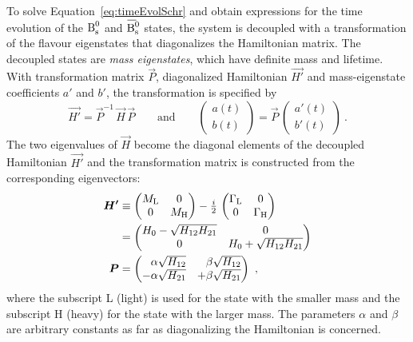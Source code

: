 To solve Equation~\ref{eq:timeEvolSchr} and obtain expressions for the time evolution of the $\text{B}_\text{s}^\text{0}$ and $\Bsbar$ states, the system is
decoupled with a transformation of the flavour eigenstates that diagonalizes the Hamiltonian matrix. The decoupled states are \emph{mass
eigenstates}, which have definite mass and lifetime. With transformation matrix $\vec{P}$, diagonalized Hamiltonian $\vec{H'}$ and
mass-eigenstate coefficients $a'$ and $b'$, the transformation is specified by
\begin{equation}
  \label{eq:timeEvolTrans}
  \vec{H'} = \vec{P}^{-1}\,\vec{H}\,\vec{P}
  \qquad \text{and} \qquad
  \begin{pmatrix} a(t) \\ b(t) \end{pmatrix}
    = \vec{P}\, \begin{pmatrix} a'(t) \\ b'(t) \end{pmatrix}
  \ .
\end{equation}
The two eigenvalues of $\vec{H}$ become the diagonal elements of the decoupled Hamiltonian $\vec{H'}$ and the transformation matrix is
constructed from the corresponding eigenvectors:
\begin{subequations}
  \label{eq:timeEvolMassStates}
  \begin{align}
    \vec{H'} &\equiv \begin{pmatrix} \mL & 0 \\ 0 & \mH \end{pmatrix}
             - \tfrac{i}{2}\, \begin{pmatrix} \GL & 0 \\ 0 & \GH \end{pmatrix}
    \label{eq:timeEvolMassStatesHamil1} \\
    &= \begin{pmatrix} H_0 - \sqrt{H_{12} H_{21}} & 0 \\ 0 & H_0 + \sqrt{H_{12} H_{21}} \end{pmatrix}
    \label{eq:timeEvolMassStatesHamil2} \\
    \vec{P}  &= \begin{pmatrix*}[r]
                   \alpha\sqrt{H_{12}} &  \beta\sqrt{H_{12}} \\
                  -\alpha\sqrt{H_{21}} & +\beta\sqrt{H_{21}}
                \end{pmatrix*}
    \label{eq:timeEvolMassTrans}
    \ ,
  \end{align}
\end{subequations}
where the subscript L (light) is used for the state with the smaller mass and the subscript H (heavy) for the state with the larger mass.
The parameters $\alpha$ and $\beta$ are arbitrary constants as far as diagonalizing the Hamiltonian is concerned.

